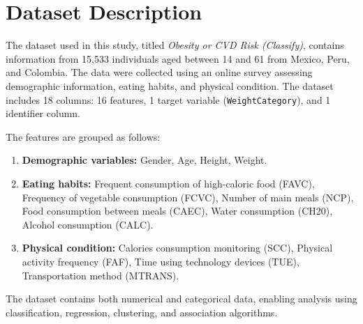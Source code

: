 \chapter{Dataset Description}\label{ch:dataset-description}


The dataset used in this study, titled \textit{Obesity or CVD Risk (Classify)}, contains information from 15,533 individuals aged between 14 and 61 from Mexico, Peru, and Colombia.
The data were collected using an online survey assessing demographic information, eating habits, and physical condition.
The dataset includes 18 columns: 16 features, 1 target variable (\texttt{WeightCategory}), and 1 identifier column.

The features are grouped as follows:

\begin{enumerate}
    \item \textbf{Demographic variables:} Gender, Age, Height, Weight.
    \item \textbf{Eating habits:} Frequent consumption of high-caloric food (FAVC), Frequency of vegetable consumption (FCVC), Number of main meals (NCP), Food consumption between meals (CAEC), Water consumption (CH20), Alcohol consumption (CALC).
    \item \textbf{Physical condition:} Calories consumption monitoring (SCC), Physical activity frequency (FAF), Time using technology devices (TUE), Transportation method (MTRANS).
\end{enumerate}

The dataset contains both numerical and categorical data, enabling analysis using classification, regression, clustering, and association algorithms.




